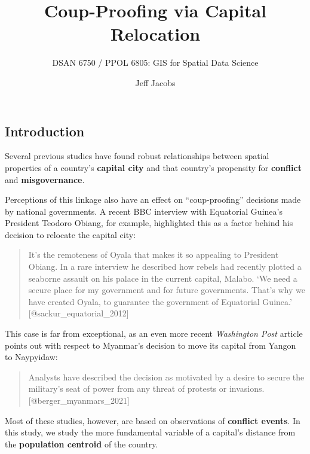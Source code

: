 \documentclass[
  letterpaper,
  DIV=11,
  numbers=noendperiod]{scrartcl}
\title{Coup-Proofing via Capital Relocation}
\subtitle{DSAN 6750 / PPOL 6805: GIS for Spatial Data Science}
\author{Jeff Jacobs}
\date{}
\begin{document}
\maketitle
\ifdefined\Shaded\renewenvironment{Shaded}{\begin{tcolorbox}[sharp corners, enhanced, breakable, boxrule=0pt, borderline west={3pt}{0pt}{shadecolor}, interior hidden, frame hidden]}{\end{tcolorbox}}\fi

\hypertarget{introduction}{%
\subsection{Introduction}\label{introduction}}

Several previous studies have found robust relationships between spatial
properties of a country's \textbf{capital city} and that country's
propensity for \textbf{conflict} and \textbf{misgovernance}.

Perceptions of this linkage also have an effect on ``coup-proofing''
decisions made by national governments. A recent BBC interview with
Equatorial Guinea's President Teodoro Obiang, for example, highlighted
this as a factor behind his decision to relocate the capital city:

\begin{quote}
It's the remoteness of Oyala that makes it so appealing to President
Obiang. In a rare interview he described how rebels had recently plotted
a seaborne assault on his palace in the current capital, Malabo. `We
need a secure place for my government and for future governments. That's
why we have created Oyala, to guarantee the government of Equatorial
Guinea.' {[}@sackur\_equatorial\_2012{]}
\end{quote}

This case is far from exceptional, as an even more recent
\emph{Washington Post} article points out with respect to Myanmar's
decision to move its capital from Yangon to Naypyidaw:

\begin{quote}
Analysts have described the decision as motivated by a desire to secure
the military's seat of power from any threat of protests or invasions.
{[}@berger\_myanmars\_2021{]}
\end{quote}

Most of these studies, however, are based on observations of
\textbf{conflict events}. In this study, we study the more fundamental
variable of a capital's distance from the \textbf{population centroid}
of the country.
\end{document}
